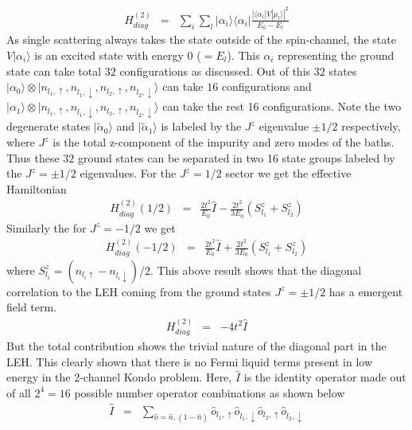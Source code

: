 \documentclass[reprint,prb,superscriptaddress]{revtex4-2}
\begin{document}
\begin{eqnarray}
H^{(2)}_{diag} &=& \sum_{i} \sum_l |\alpha_i\rangle\langle \alpha_i | \frac{|\langle \alpha_i  | V| \mu_l \rangle|^2 }{E_0-E_{l}}
\end{eqnarray}
As single scattering always takes the state outside of the spin-channel, the state $V|\alpha_i\rangle$ is an excited state with energy $0$ ($=E_l$). This $\alpha_i$ representing the ground state can take total $32$ configurations as discussed. Out of this $32$ states $| {\alpha}_0\rangle\otimes |n_{l_1,\uparrow},n_{l_1,\downarrow},n_{l_2,\uparrow},n_{l_2,\downarrow}\rangle$ can take $16$ configurations and $| {\alpha}_1\rangle\otimes |n_{l_1,\uparrow},n_{l_1,\downarrow},n_{l_2,\uparrow},n_{l_2,\downarrow}\rangle$ can take the rest 16 configurations. Note the two degenerate states $|\tilde{\alpha}_0\rangle$  and $|\tilde{\alpha}_1\rangle$ is labeled by the $J^z$ eigenvalue $\pm 1/2$ respectively, where $J^z$ is the total z-component of the impurity and zero modes of the baths. Thus these $32$ ground states can be separated in two 16 state groups labeled by the $J^z=\pm 1/2$ eigenvalues. For the $J^z=1/2$ sector we get the effective Hamiltonian
\begin{eqnarray}
H^{(2)}_{diag} (1/2) &=& \frac{2t^2}{E_0} \hat{I} - \frac{2t^2}{3E_0} ( S_{l_1}^z + S_{l_2}^z)
\end{eqnarray}
Similarly the for $J^z=-1/2$ we get 
\begin{eqnarray}
H^{(2)}_{diag} (-1/2) &=& \frac{2t^2}{E_0} \hat{I} + \frac{2t^2}{3E_0} (S_{l_1}^z+S_{l_2}^z)
\end{eqnarray}
where $S_{l_i}^z=(n_{l_i\uparrow}-n_{l_i\downarrow})/2.$ This above result shows that the diagonal correlation to the LEH coming from the ground states $J^z=\pm 1/2$ has a emergent field term. 
\begin{eqnarray}
H^{(2)}_{diag} &=& -4t^2 \hat{I}
\end{eqnarray}
But the total contribution shows the trivial nature of the diagonal part in the LEH. This clearly shown that there is no Fermi liquid terms present in low energy in the 2-channel Kondo problem. Here, $\hat{I}$ is the identity operator made out of all $2^4=16$ possible number operator combinations as shown below
\begin{eqnarray}
\hat{I} &=& \sum_{\hat{o}=\hat{n},(1-\hat{n})} \hat{o}_{l_1,\uparrow}\hat{o}_{l_1,\downarrow} \hat{o}_{l_2,\uparrow}\hat{o}_{l_2,\downarrow}
\end{eqnarray}
\end{document}
